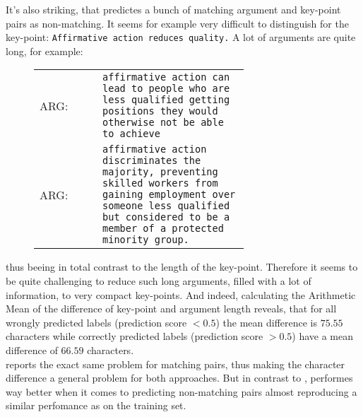 It's also striking, that \Bert predictes a bunch of matching argument and key-point pairs as non-matching. It seems for 
example very difficult to distinguish for the key-point: \texttt{Affirmative action reduces quality.} A lot of 
arguments are quite long, for example:\\

\begin{figure}[H]
    \begin{tabularx}{\linewidth}{lp{0.7\linewidth}}
            ARG: & \texttt{affirmative action can lead to people who are less qualified getting positions they would otherwise not be able to achieve}\\
            ARG: & \texttt{affirmative action discriminates the majority, preventing skilled workers from gaining employment over someone less qualified but considered to be a member of a protected minority group.}
    \end{tabularx}
\end{figure}

thus beeing in total contrast to the length of the key-point. Therefore it seems to be quite challenging to reduce 
such long arguments, filled with a lot of information, to very compact key-points. And indeed, 
calculating the Arithmetic Mean of the difference of key-point and argument length reveals, that 
for all wrongly predicted labels (prediction score $< 0.5$) the mean difference is $75.55$ characters while 
correctly predicted labels (prediction score $> 0.5$) have a mean difference of $66.59$ characters.\\

\Roberta reports the exact same problem for matching pairs, thus making the character difference a general problem for 
both approaches. But in contrast to \Bert, \Roberta performes way better when it comes to predicting non-matching pairs
almost reproducing a similar perfomance as on the training set.


